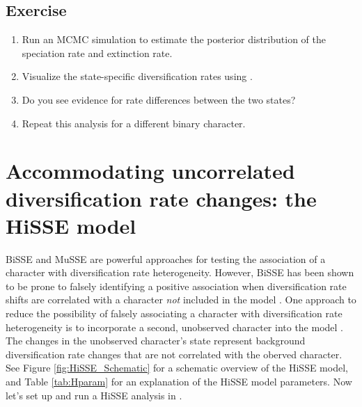 


\subsection{Exercise}

\begin{enumerate}
\item Run an MCMC simulation to estimate the posterior distribution of the speciation rate and extinction rate.
\item Visualize the state-specific diversification rates using \R.
\item Do you see evidence for rate differences between the two states?
\item Repeat this analysis for a different binary character.
\end{enumerate}


\newpage
\section{Accommodating uncorrelated diversification rate changes: the HiSSE model}\label{sec:HiSSE_Theory}

BiSSE and MuSSE are powerful approaches for testing the association of a character
with diversification rate heterogeneity.
However, BiSSE has been shown to be prone to falsely identifying a positive association
when diversification rate shifts are correlated with a character \textit{not} included in the model \citep{Maddison2015, Rabosky2015}.
One approach to reduce the possibility of falsely associating a character with diversification rate
heterogeneity is to incorporate a second, unobserved character into the model  \citep[i.e.\ a Hidden State-Dependent Speciation and Extinction (HiSSE) model;][]{Beaulieu2016}.
The changes in the unobserved character's state represent background diversification rate changes
that are not correlated with the oberved character.
See Figure \ref{fig:HiSSE_Schematic} for a schematic overview of the HiSSE model, and Table \ref{tab:Hparam} for an explanation of the HiSSE model parameters.
Now let's set up and run a HiSSE analysis in \RevBayes.


